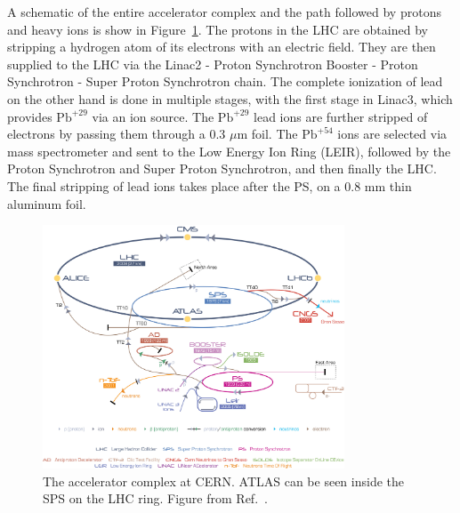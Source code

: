 A schematic of the entire accelerator complex and the path followed by protons and heavy ions is show in Figure~\ref{fig:cern}.
The protons in the LHC are obtained by stripping a hydrogen atom of its electrons with an electric field.
They are then supplied to the LHC via the Linac2 - Proton Synchrotron Booster - Proton Synchrotron - Super Proton Synchrotron chain.
The complete ionization of lead on the other hand is done in multiple stages, with the first stage in Linac3, which provides $\mathrm{Pb}^{+29}$ via an ion source.
The $\mathrm{Pb}^{+29}$ lead ions are further stripped of electrons by passing them through a 0.3 $\mu$m foil.
The $\mathrm{Pb}^{+54}$ ions are selected via mass spectrometer and sent to the Low Energy Ion Ring (LEIR), followed by the Proton Synchrotron and Super Proton Synchrotron, and then finally the LHC.
The final stripping of lead ions takes place after the PS, on a 0.8 mm thin aluminum foil.


\begin{figure}[ht]
	\centering
	\includegraphics[width=0.8\textwidth]{figures/setup/cern.jpg} %
	\caption{The accelerator complex at CERN.
ATLAS can be seen inside the SPS on the LHC ring.
Figure from Ref.~\cite{Christiane:1260465}.}
	\label{fig:cern}%
\end{figure}


